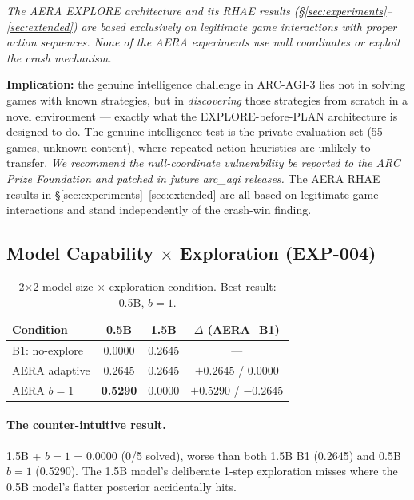 \documentclass[11pt]{article}
\begin{document}
\emph{The AERA EXPLORE architecture and its RHAE results (\S\ref{sec:experiments}--\ref{sec:extended}) are based exclusively on legitimate game interactions with proper action sequences. None of the AERA experiments use null coordinates or exploit the crash mechanism.}

\textbf{Implication:} the genuine intelligence challenge in ARC-AGI-3 lies not in solving games with known strategies, but in \emph{discovering} those strategies from scratch in a novel environment --- exactly what the EXPLORE-before-PLAN architecture is designed to do. The genuine intelligence test is the private evaluation set (55 games, unknown content), where repeated-action heuristics are unlikely to transfer. \emph{We recommend the null-coordinate vulnerability be reported to the ARC Prize Foundation and patched in future arc\_agi releases.} The AERA RHAE results in \S\ref{sec:experiments}--\ref{sec:extended} are all based on legitimate game interactions and stand independently of the crash-win finding.

\subsection{Model Capability $\times$ Exploration (EXP-004)}
\label{sec:capability}

\begin{table}[h]
\centering
\caption{2$\times$2 model size $\times$ exploration condition. Best result: 0.5B, $b{=}1$.}
\label{tab:capability}
\begin{tabular}{lccc}
\toprule
Condition & 0.5B & 1.5B & $\Delta$ (AERA$-$B1) \\
\midrule
B1: no-explore       & 0.0000 & 0.2645 & --- \\
AERA adaptive        & 0.2645 & 0.2645 & $+0.2645$ / $0.0000$ \\
AERA $b{=}1$         & \textbf{0.5290} & 0.0000 & $+0.5290$ / $-0.2645$ \\
\bottomrule
\end{tabular}
\end{table}

\paragraph{The counter-intuitive result.} 1.5B + $b{=}1$ = $0.0000$ (0/5 solved), worse than both 1.5B B1 (0.2645) and 0.5B $b{=}1$ (0.5290). The 1.5B model's deliberate 1-step exploration misses where the 0.5B model's flatter posterior accidentally hits.
\end{document}
